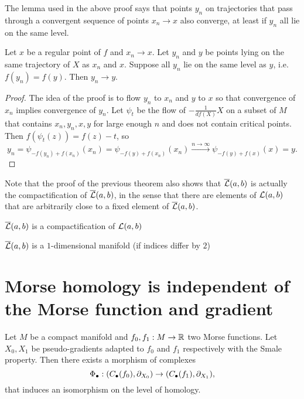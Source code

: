 The lemma used in the above proof says that points $y_n$ on trajectories that pass through a convergent sequence of points $x_n \to x$ also converge, at least if $y_n$ all lie on the same level.
\begin{marginfigure}
    \centering
    \caption{TODO lemma partial squared zero proof}
    \label{fig:lemma-partial-squared-zero-proof}
\end{marginfigure}
\begin{lemma}
    Let $x$ be a regular point of $f$ and $x_n \to x$.
    Let $y_n$ and  $y$ be points lying on the same trajectory of $X$ as  $x_n$ and  $x$.
    Suppose all $y_n$ lie on the same level as  $y$, i.e.  $f(y_n) = f(y)$.
    Then  $y_n \to  y$.
\end{lemma}
\begin{proof}
    The idea of the proof is to flow $y_n$ to  $x_n$ and $y$ to $x$ so that convergence of $x_n$ implies convergence of $y_n$.
    Let  $\psi_t$ be the flow of  $-\frac{1}{df (X)} X$ on a subset of $M$ that contains $x_n, y_n, x, y$ for large enough  $n$ and does not contain critical points.
    Then $f(\psi_t(z)) = f(z) - t$, so
     \[
         y_n = \psi_{-f(y_n) + f(x_n)}(x_n) = \psi_{-f(y) + f(x_n)}(x_n) \xrightarrow{n \to \infty}   \psi_{-f(y) + f(x)}(x) = y
    .\] 
\end{proof}

Note that the proof of the previous theorem also shows that $\overline{\mathcal L}(a, b) $ is actually the compactification of  $\overline{\mathcal L}(a, b)$, in the sense that there are elements of  $\mathcal L(a, b)$ that are arbitrarily close to a fixed element of $\overline{\mathcal L}(a, b)$.
\begin{prop}
$\overline{\mathcal L}(a, b)$ is a compactification of $\mathcal L(a, b)$
\end{prop}
\begin{prop}
$\overline{\mathcal L}(a, b) $ is a $1$-dimensional manifold (if indices differ by $2$)
\end{prop}


\section{Morse homology is independent of the Morse function and gradient}
\begin{theorem}
    Let $M$ be a compact manifold and $ f_0, f_1: M \to  \mathbb{R}$ two Morse functions.
    Let $X_0, X_1$ be pseudo-gradients adapted to $f_0$ and $ f_1$ respectively with the Smale property.
    Then there exists a morphism of complexes
    \[
        \Phi_{\bullet}:
        (C_\bullet(f_0), \partial_{X_0}) \to  
        (C_\bullet(f_1), \partial_{X_1})
    ,\] 
    that induces an isomorphism on the level of homology.
\end{theorem}
    
